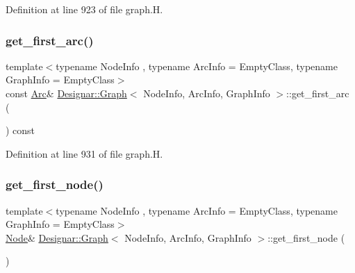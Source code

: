 Definition at line 923 of file graph.\+H.

\mbox{\label{class_designar_1_1_graph_a3a4be7fef798a957b0a66102f1d30c39}} 
\subsubsection{\texorpdfstring{get\+\_\+first\+\_\+arc()}{get\_first\_arc()}\hspace{0.1cm}{\footnotesize\ttfamily [2/2]}}
{\footnotesize\ttfamily template$<$typename Node\+Info , typename Arc\+Info  = Empty\+Class, typename Graph\+Info  = Empty\+Class$>$ \\
const \hyperlink{class_designar_1_1_graph_a74c730ef4ce2d20f998d72bd25c2b5bf}{Arc}\& \hyperlink{class_designar_1_1_graph}{Designar\+::\+Graph}$<$ Node\+Info, Arc\+Info, Graph\+Info $>$\+::get\+\_\+first\+\_\+arc (\begin{DoxyParamCaption}{ }\end{DoxyParamCaption}) const\hspace{0.3cm}{\ttfamily [inline]}}



Definition at line 931 of file graph.\+H.

\mbox{\label{class_designar_1_1_graph_ab9f34a6b6160f9e66a3103c78b13d7d6}} 
\subsubsection{\texorpdfstring{get\+\_\+first\+\_\+node()}{get\_first\_node()}\hspace{0.1cm}{\footnotesize\ttfamily [1/2]}}
{\footnotesize\ttfamily template$<$typename Node\+Info , typename Arc\+Info  = Empty\+Class, typename Graph\+Info  = Empty\+Class$>$ \\
\hyperlink{class_designar_1_1_graph_a5dfc7dba9d092ac489c72e40390c37d0}{Node}\& \hyperlink{class_designar_1_1_graph}{Designar\+::\+Graph}$<$ Node\+Info, Arc\+Info, Graph\+Info $>$\+::get\+\_\+first\+\_\+node (\begin{DoxyParamCaption}{ }\end{DoxyParamCaption})\hspace{0.3cm}{\ttfamily [inline]}}



